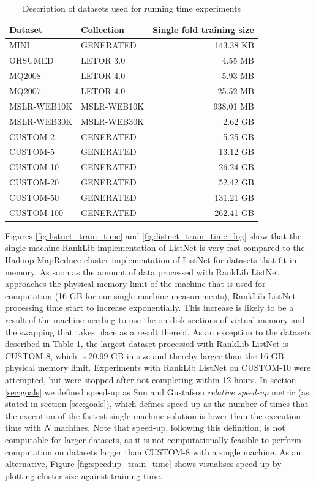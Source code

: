 \begin{table}[!h]
\centering
\begin{tabular}{p{3.4cm}p{3.4cm}r}\toprule
Dataset & Collection & Single fold training size \\
\midrule
MINI		& GENERATED		  & 143.38 KB\\
OHSUMED     & LETOR 3.0       &   4.55 MB\\
MQ2008      & LETOR 4.0       &   5.93 MB\\
MQ2007      & LETOR 4.0       &  25.52 MB\\
MSLR-WEB10K & MSLR-WEB10K     & 938.01 MB\\
MSLR-WEB30K & MSLR-WEB30K     &   2.62 GB\\
CUSTOM-2	& GENERATED		  &   5.25 GB\\
CUSTOM-5	& GENERATED		  &  13.12 GB\\
CUSTOM-10	& GENERATED		  &  26.24 GB\\
CUSTOM-20   & GENERATED       &  52.42 GB\\
CUSTOM-50	& GENERATED		  & 131.21 GB\\
CUSTOM-100	& GENERATED		  & 262.41 GB\\
\bottomrule
\end{tabular}
\caption{Description of datasets used for running time experiments}
\label{tbl:recap_datasets}
\end{table}

Figures \ref{fig:listnet_train_time} and \ref{fig:listnet_train_time_log} show that the single-machine RankLib implementation of ListNet is very fast compared to the Hadoop MapReduce cluster implementation of ListNet for datasets that fit in memory. As soon as the amount of data processed with RankLib ListNet approaches the physical memory limit of the machine that is used for computation (16 GB for our single-machine measurements), RankLib ListNet processing time start to increase exponentially. This increase is likely to be a result of the machine needing to use the on-disk sections of virtual memory and the swapping that takes place as a result thereof. As an exception to the datasets described in Table \ref{tbl:recap_datasets}, the largest dataset processed with RankLib ListNet is CUSTOM-8, which is 20.99 GB in size and thereby larger than the 16 GB physical memory limit. Experiments with RankLib ListNet on CUSTOM-10 were attempted, but were stopped after not completing within 12 hours. In section \ref{sec:goals} we defined speed-up as Sun and Gustafson \emph{relative speed-up} metric \cite{Sun1991} (as stated in section \ref{sec:goals}), which defines speed-up as the number of times that the execution of the fastest single machine solution is lower than the execution time with $N$ machines. Note that speed-up, following this definition, is not computable for larger datasets, as it is not computationally feasible to perform computation on datasets larger than CUSTOM-8 with a single machine. As an alternative, Figure \ref{fig:speedup_train_time} shows visualises speed-up by plotting cluster size against training time.\\


